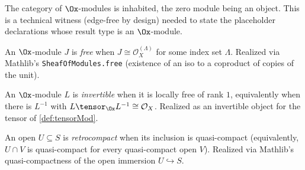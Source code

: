 \begin{definition}
  \label{def:nonempty_modules}
  The category of $\Ox$-modules is inhabited, the zero module being an object.
  This is a technical witness (edge-free by design) needed to state the
  placeholder declarations whose result type is an $\Ox$-module.
\end{definition}

\begin{definition}

  \label{def:isFreeMod}
  An $\Ox$-module $J$ is \emph{free} when $J \cong \mathcal{O}_X^{(\Lambda)}$ for
  some index set $\Lambda$. Realized via Mathlib's \texttt{SheafOfModules.free}
  (existence of an iso to a coproduct of copies of the unit).
\end{definition}

\begin{definition}

  \label{def:isInvertibleMod}
  An $\Ox$-module $L$ is \emph{invertible} when it is locally free of rank $1$,
  equivalently when there is $L^{-1}$ with $L \tensor_{\Ox} L^{-1} \cong
  \mathcal{O}_X$. Realized as an invertible object for the tensor of
  \cref{def:tensorMod}.
\end{definition}


\begin{definition}
  \label{def:isRetrocompact}
  An open $U \subseteq S$ is \emph{retrocompact} when its inclusion is
  quasi-compact (equivalently, $U \cap V$ is quasi-compact for every
  quasi-compact open $V$). Realized via Mathlib's quasi-compactness of the open
  immersion $U \hookrightarrow S$.
\end{definition}

